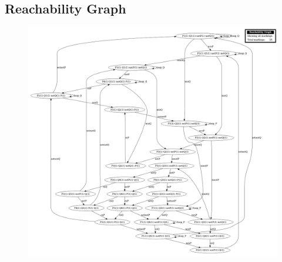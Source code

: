 \documentclass{article}
\begin{document}
\subsection{Reachability Graph}
\begin{figure}[h] 
\centering
\includegraphics[scale=0.45]{RG3.6.png}
\end{figure}
\end{document}

